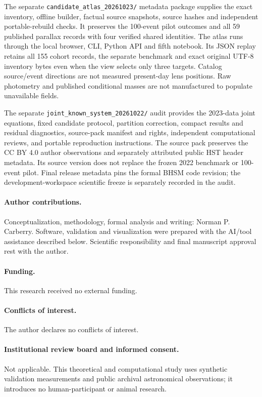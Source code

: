 \documentclass[11pt,a4paper]{article}
\begin{document}
The separate \texttt{candidate\_atlas\_20261023/} metadata package supplies
the exact inventory, offline builder, factual source snapshots, source
hashes and independent portable-rebuild checks. It preserves the 100-event
pilot outcomes and all 59 published parallax records with four verified
shared identities. The atlas runs through the local browser, CLI, Python
API and fifth notebook. Its JSON replay retains all 155 cohort records,
the separate benchmark and exact original UTF-8 inventory bytes even
when the view selects only three targets. Catalog source/event directions
are not measured present-day lens positions. Raw photometry and published
conditional masses are not manufactured to populate unavailable fields.

The separate \texttt{joint\_known\_system\_20261022/} audit provides the
2023-data joint equations, fixed candidate protocol, partition correction,
compact results and residual diagnostics, source-pack manifest and rights,
independent computational reviews, and portable reproduction instructions.
The source pack preserves the CC BY 4.0 author observations
\cite{Mroz2022Data,LamLu2023} and separately attributed public HST header
metadata. Its source version does not replace the frozen 2022 benchmark or
100-event pilot. Final release metadata pins the formal BHSM code revision;
the development-workspace scientific freeze is separately recorded in the audit.

\paragraph{Author contributions.}
Conceptualization, methodology, formal analysis and writing:
Norman P. Carberry. Software, validation and visualization were prepared
with the AI/tool assistance described below. Scientific responsibility
and final manuscript approval rest with the author.

\paragraph{Funding.}
This research received no external funding.

\paragraph{Conflicts of interest.}
The author declares no conflicts of interest.

\paragraph{Institutional review board and informed consent.}
Not applicable. This theoretical and computational study uses synthetic
validation measurements and public archival astronomical observations;
it introduces no human-participant or animal research.
\end{document}
